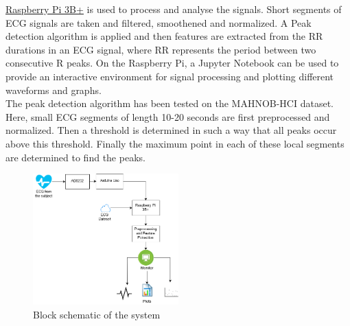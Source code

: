 \documentclass[11pt]{article}
\theoremstyle{definition}
\begin{document}
  \underline{Raspberry Pi 3B+} is used to process and analyse the signals.
  Short segments of ECG signals are taken and filtered, smoothened and normalized.
  A Peak detection algorithm is applied and then features are extracted from the RR durations in an ECG signal, where RR represents the period between two consecutive R peaks.
  On the Raspberry Pi, a Jupyter Notebook can be used to provide an interactive environment for signal processing and plotting different waveforms and graphs.\\ 
  
  The peak detection algorithm has been tested on the MAHNOB-HCI\cite{lichtenauer2011mahnob} dataset. Here, small ECG segments of length 10-20 seconds are first preprocessed and normalized. Then a threshold is determined in such a way that all peaks occur above this threshold. Finally the maximum point in each of these local segments are determined to find the peaks.
  


\begin{figure}[h]
\caption{Block schematic of the system}
\centering
\includegraphics[width=0.5\textwidth]{block_diagram}
\end{figure}
\end{document}
